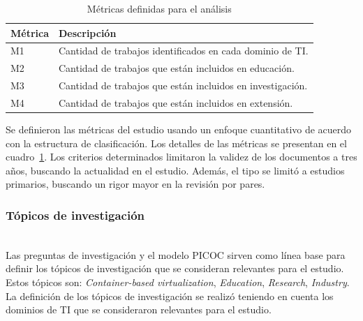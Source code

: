 \begin{table}[htbp]
\centering
\renewcommand{\arraystretch}{1.3}
\begin{tabularx}{\columnwidth}{>{\centering\arraybackslash}m{} >{\RaggedRight\arraybackslash}X}
\toprule
\textbf{Métrica} & \textbf{Descripción} \\
\midrule
M1 & Cantidad de trabajos identificados en cada dominio de TI. \\
M2 & Cantidad de trabajos que están incluidos en educación. \\
M3 & Cantidad de trabajos que están incluidos en investigación. \\
M4 & Cantidad de trabajos que están incluidos en extensión. \\
\bottomrule
\end{tabularx}
\caption{Métricas definidas para el análisis}
\label{tab:metricas}
\end{table}

Se definieron las métricas del estudio usando un enfoque cuantitativo de acuerdo con la estructura de clasificación. Los detalles de las métricas se presentan en el cuadro~\ref{tab:metricas}.
Los criterios determinados limitaron la validez de los documentos a tres años, buscando la actualidad en el estudio. Además, el tipo se limitó a estudios primarios, buscando un rigor mayor en la revisión por pares.\\

\subsubsection{Tópicos de investigación}
\mbox{}\\
Las preguntas de investigación y el modelo PICOC sirven como línea base para definir los tópicos de investigación que se consideran relevantes para el estudio. Estos tópicos son: \textit{Container-based virtualization}, \textit{Education}, \textit{Research}, \textit{Industry}. 
La definición de los tópicos de investigación se realizó teniendo en cuenta los dominios de TI que se consideraron relevantes para el estudio.\\

